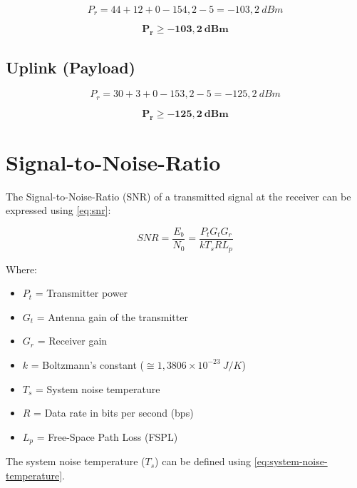 \begin{equation}
    P_{r} = 44 + 12 + 0 - 154,2 - 5 = -103,2\ dBm
\end{equation}

\begin{equation}
    \mathbf{P_{r} \geq -103,2\ dBm}
\end{equation}

\subsection{Uplink (Payload)}

\begin{equation}
    P_{r} = 30 + 3 + 0 - 153,2 - 5 = -125,2\ dBm
\end{equation}

\begin{equation}
    \mathbf{P_{r} \geq -125,2\ dBm}
\end{equation}

\section{Signal-to-Noise-Ratio}

The Signal-to-Noise-Ratio (SNR) of a transmitted signal at the receiver can be expressed using \autoref{eq:snr}:

\begin{equation} \label{eq:snr}
    SNR = \frac{E_{b}}{N_{0}} = \frac{P_{t}G_{t}G_{r}}{kT_{s}RL_{p}}
\end{equation}

Where:

\begin{itemize}
    \item $P_{t}$ = Transmitter power
    \item $G_{t}$ = Antenna gain of the transmitter
    \item $G_{r}$ = Receiver gain
    \item $k$ = Boltzmann's constant ($\cong 1,3806 \times 10^{-23}\ J/K$)
    \item $T_{s}$ = System noise temperature
    \item $R$ = Data rate in bits per second (bps)
    \item $L_{p}$ = Free-Space Path Loss (FSPL)
\end{itemize}

The system noise temperature ($T_{s}$) can be defined using \autoref{eq:system-noise-temperature}.

